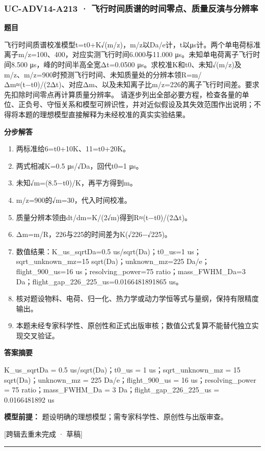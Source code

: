 \documentclass[UTF8,11pt,a4paper]{ctexart}
\begin{document}
\subsubsection*{UC-ADV14-A213 · 飞行时间质谱的时间零点、质量反演与分辨率}
\noindent\textbf{题目}\par
飞行时间质谱校准模型t=t0+K√(m/z)，m/z以Da/e计，t以μs计。两个单电荷标准离子m/z=100、400，对应实测飞行时间6.000与11.000 μs。未知单电荷离子飞行时间8.500 μs，峰的时间半高全宽Δt=0.0500 μs。求校准K和t0、未知√(m/z)及m/z、m/z=900时预测飞行时间、未知质量处的分辨本领R=m/Δm≈(t−t0)/(2Δt)、对应Δm、以及未知离子比m/z=226的离子飞行时间差。要求先扣除时间零点再计算质量分辨率。 请逐步列出全部必要方程，检查各量的单位、正负号、守恒关系和模型可辨识性，并对近似假设及其失效范围作出说明；不得将本题的理想模型直接解释为未经校准的真实实验结果。\par
\medskip\noindent\textbf{分步解答}
\begin{enumerate}
\item 两标准给6=t0+10K、11=t0+20K。
\item 两式相减K=0.5 μs/√Da，回代t0=1 μs。
\item 未知√m=(8.5−t0)/K，再平方得到m。
\item m/z=900的√m=30，代入时间校准。
\item 质量分辨本领由dt/dm=K/(2√m)得到R≈(t−t0)/(2Δt)。
\item Δm=m/R，226与225的时间差为K(√226−√225)。
\item 数值结果：K\_us\_sqrtDa=0.5 us/sqrt(Da)；t0\_us=1 us；sqrt\_unknown\_mz=15 sqrt(Da)；unknown\_mz=225 Da/e；flight\_900\_us=16 us；resolving\_power=75 ratio；mass\_FWHM\_Da=3 Da；flight\_gap\_226\_225\_us=0.0166481891865 us。
\item 核对题设物料、电荷、归一化、热力学或动力学恒等式与量纲，保持有限精度输出。
\item 本题未经专家科学性、原创性和正式出版审核；数值公式复算不能替代独立实现交叉验证。
\end{enumerate}
\noindent\textbf{答案摘要}\par
K\_us\_sqrtDa = 0.5 us/sqrt(Da)；t0\_us = 1 us；sqrt\_unknown\_mz = 15 sqrt(Da)；unknown\_mz = 225 Da/e；flight\_900\_us = 16 us；resolving\_power = 75 ratio；mass\_FWHM\_Da = 3 Da；flight\_gap\_226\_225\_us = 0.0166481892 us\par
\noindent\textbf{模型前提：}
题设明确的理想模型；需专家科学性、原创性与出版审查。\par
\noindent\textcolor{red!65!black}{[跨辑去重未完成 · 草稿]} \par
\medskip\hrule\medskip
{}
\end{document}
